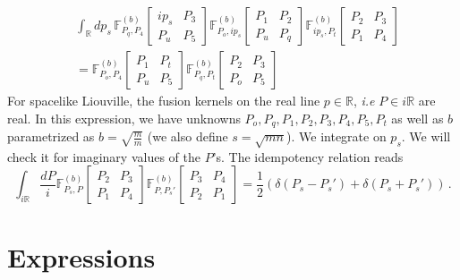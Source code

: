 \documentclass[11pt]{article}
\begin{document}
\begin{equation}\label{eq:Pentagoninlittlep}
    \begin{aligned}
        &\int_{\mathbb{R}} dp_s \, \mathbb{F}^{(b)}_{P_q, P_4} 
    \begin{bmatrix}
     ip_s & P_3 \\
     P_u & P_5
     \end{bmatrix}
\mathbb{F}^{(b)}_{P_o, ip_s} 
    \begin{bmatrix}
     P_1 & P_2 \\
     P_u & P_q
     \end{bmatrix}
\mathbb{F}^{(b)}_{ip_s, P_t} 
    \begin{bmatrix}
     P_2 & P_3 \\
     P_1 & P_4
     \end{bmatrix}\\
&= \mathbb{F}^{(b)}_{P_o, P_4} 
    \begin{bmatrix}
     P_1 & P_t \\
     P_u & P_5
     \end{bmatrix}
\mathbb{F}^{(b)}_{P_q, P_t} 
    \begin{bmatrix}
     P_2 & P_3 \\
     P_o & P_5
     \end{bmatrix}
    \end{aligned}
\end{equation}
For spacelike Liouville, the fusion kernels on the real line $p\in \mathbb{R}$, \textit{i.e} $P\in i\mathbb{R}$ are real. In this expression, we have unknowns $P_o,P_q, P_1, P_2, P_3, P_4, P_5, P_t$ as well as $b$ parametrized as $b=\sqrt{\frac
{m}{m}}$ (we also define $s=\sqrt{mn}$). We integrate on $p_s$. We will check it for imaginary values of the $P$'s. The idempotency relation reads
\begin{equation}
    \int_{i\mathbb{R}} \frac{dP}{i} \mathbb{F}^{(b)}_{P_s, P} \begin{bmatrix}
     P_2 & P_3 \\
     P_1 & P_4
    \end{bmatrix}
    \mathbb{F}^{(b)}_{P, P_s'} \begin{bmatrix}
     P_3 & P_4 \\
     P_2 & P_1
    \end{bmatrix}
    = \frac{1}{2} \left(\delta(P_s - P_s')+\delta(P_s+P_s')\right)\,.
\end{equation}


\section{Expressions}
\end{document}
